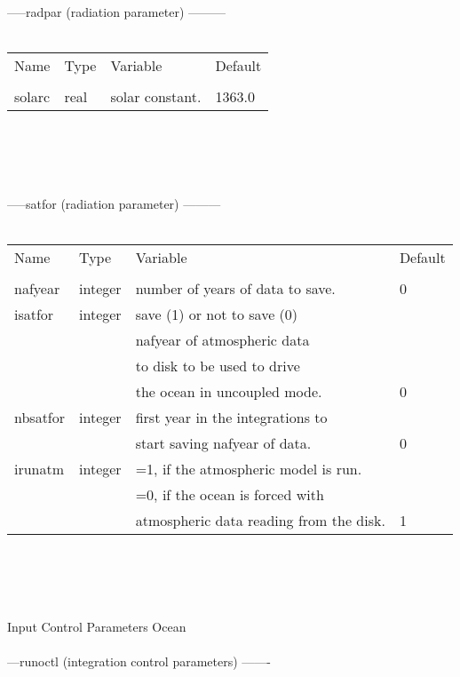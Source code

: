 -----radpar   (radiation parameter) ---------      \\
\\
\begin{tabular}{llll}
\\
Name	&    Type  &	Variable		&		Default    \\
\\
solarc	&    real  &	solar constant.		&		1363.0     \\  \hline  
\end{tabular}
\\
\\
\\
\\
-----satfor   (radiation parameter) ---------      \\
\\
\begin{tabular}{llll}
Name	&    Type  &	Variable		&		Default    \\
\\
\hline
nafyear  &   integer  & number of years of data to save.  &    0            \\
isatfor	&    integer  &	save (1) or not to save (0)                         \\
        &             & nafyear of atmospheric data                         \\
        &             & to disk to be used to drive                         \\
        &             & the ocean in uncoupled mode.      &    0            \\
nbsatfor &   integer  & first year in the integrations to                   \\
         &            & start saving nafyear  of data.    &    0            \\
irunatm  &   integer  & =1, if the atmospheric model is run.                \\
         &            & =0, if the ocean is forced with                     \\
         &            & atmospheric data reading from the disk. & 1         \\  \hline
\end{tabular}
\\
\\
\\
\\
{}  Input Control Parameters Ocean\\ \\
---runoctl  (integration control parameters) -------\\ \
